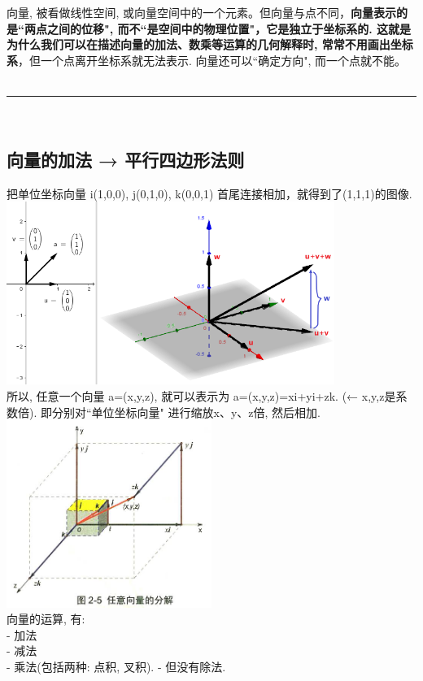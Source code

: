\documentclass[UTF8]{ctexart}
\begin{document}
向量, 被看做线性空间, 或向量空间中的一个元素。但向量与点不同，\textbf{向量表示的是``两点之间的位移", 而不``是空间中的物理位置"，它是独立于坐标系的. 这就是为什么我们可以在描述向量的加法、数乘等运算的几何解释时, 常常不用画出坐标系}，但一个点离开坐标系就无法表示. 向量还可以``确定方向", 而一个点就不能。\\



~\\
\hrule
~\\

\subsection{向量的加法 → 平行四边形法则}

把单位坐标向量 i(1,0,0), j(0,1,0), k(0,0,1) 首尾连接相加，就得到了(1,1,1)的图像. \\
\includegraphics[width=0.8\textwidth]{img/0122.png}\\

所以, 任意一个向量 a=(x,y,z), 就可以表示为 a=(x,y,z)=xi+yi+zk.  (← x,y,z是系数倍). 即分别对``单位坐标向量" 进行缩放x、y、z倍, 然后相加.\\
\includegraphics[width=0.5\textwidth]{img/0123.png}\\

向量的运算, 有: \\
- 加法 \\
- 减法 \\
- 乘法(包括两种: 点积, 叉积). 
- 但没有除法. \\
\end{document}
